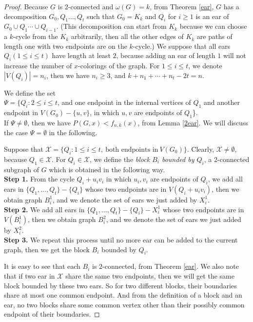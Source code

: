 \documentclass[12pt]{article}
\theoremstyle{definition}
\begin{document}
\begin{proof} Because $G$ is $2$-connected and $\omega(G)=k$, from Theorem \ref{ear}, $G$ has a decomposition
$G_0, Q_1 \ldots, Q_t$ such that $G_0=K_k$ and $Q_i$ for $i\geq 1$ is an ear of $G_0\cup Q_{1}\cdots \cup Q_{i-1}$. (This decomposition can start from $K_k$ because we can choose a $k$-cycle from the $K_k$ arbitrarily, then all the other edges of $K_k$ are paths of length one with two endpoints are on the $k$-cycle.) We suppose that all ears $Q_i (1\leq i\leq t)$ have length at least $2$, because adding an ear of length $1$ will not increase the number of $x$-colorings of the graph. For $1\leq i\leq t$, we denote $|V(Q_i)|=n_i$, then we have $n_i\geq 3$, and $k+n_1+\cdots+n_t-2t=n$.

We define the set
\\$\Psi=\{Q_i: 2\leq i\leq t$, and one endpoint in the internal vertices of $Q_1$ and another endpoint \hspace*{2cm}in $V(G_0)-\{u,v\}$, in which $u,v$ are endpoints of $Q_1$\}.
\\If $\Psi\neq\emptyset$, then  we have $P(G,x)<f_{n,k}(x)$, from Lemma \ref{2ear}. We will discuss the case $\Psi=\emptyset$ in the following.

Suppose that $\mathcal{X}=\{Q_i: 1\leq i\leq t, ~\mbox{both endpoints in} ~V(G_0)\}$. Clearly, $\mathcal{X}\neq \emptyset$, because $Q_1\in \mathcal{X}$. For $Q_i\in \mathcal{X}$, we define the {\it block $B_i$ bounded by $Q_i$}, a $2$-connected subgraph of $G$ which is obtained in the following way.
\\{\bf Step 1.} From the cycle $Q_i+u_iv_i$ in which $u_i, v_i$ are endpoints of $Q_i$, we add all ears in $\{Q_1,\ldots,Q_t\}-\{Q_i\}$ whose two endpoints are in $V(Q_i+u_iv_i)$, then we obtain graph $B^{1}_i$, and we denote the set of ears we just added by $X^1_i$.
\\{\bf Step 2.} We add all ears in $\{Q_1,\ldots, Q_t\}-\{Q_i\}-X^1_i$ whose two endpoints are in $V(B^{1}_i)$, then we obtain graph $B^{2}_i$, and we denote the set of ears we just added by $X^2_i$.
\\{\bf Step 3.} We repeat this process until no more ear can be added to the current graph, then we get the block $B_i$ bounded by $Q_i$.

It is easy to see that each $B_i$ is $2$-connected, from Theorem \ref{ear}. We also note that if two ear in $\mathcal{X}$ share the same two endpoints, then we will get the same block bounded by these two ears. So for two different blocks, their boundaries share at most one common endpoint. And from the definition of a block and an ear, no two blocks share some common vertex
other than their possibly common endpoint of their boundaries.


\end{proof}
\end{document}
